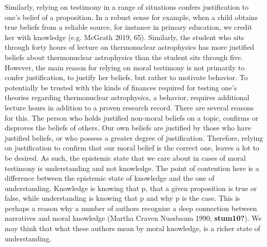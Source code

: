 \documentclass[12pt]{book}
\theoremstyle{definition}
\theoremstyle{remark}
\begin{document}
Similarly, relying on testimony in a range of situations confers justification to one's belief of a proposition. In a robust sense for example, when a child obtains true beliefs from a reliable source, for instance in primary education, we credit her with knowledge (e.g. McGrath 2019, 65). Similarly, the student who sits through forty hours of lecture on thermonuclear astrophysics has more justified beliefs about thermonuclear astrophysics than the student sits through five. However, the main reason for relying on moral testimony is not primarily to confer justification, to justify her beliefs, but rather to motivate behavior. To potentially be trusted with the kinds of finances required for testing one's theories regarding thermonuclear astrophysics, a behavior, requires additional lecture hours in addition to a proven research record. There are several reasons for this. The person who holds justified non-moral beliefs on a topic, confirms or disproves the beliefs of others. Our own beliefs are justified by those who have justified beliefs, or who possess a greater degree of justification. Therefore, relying on justification to confirm that our moral belief is the correct one, leaves a lot to be desired. As such, the epistemic state that we care about in cases of moral testimony is understanding and not knowledge. The point of contention here is a difference between the epistemic state of knowledge and the one of understanding. Knowledge is knowing that p, that a given proposition is true or false, while understanding is knowing that p and why p is the case. This is perhaps a reason why a number of authors recognize a deep connection between narratives and moral knowledge (Martha Craven Nussbaum 1990; \textbf{stum10?}). We may think that what these authors mean by moral knowledge, is a richer state of understanding.
\end{document}

